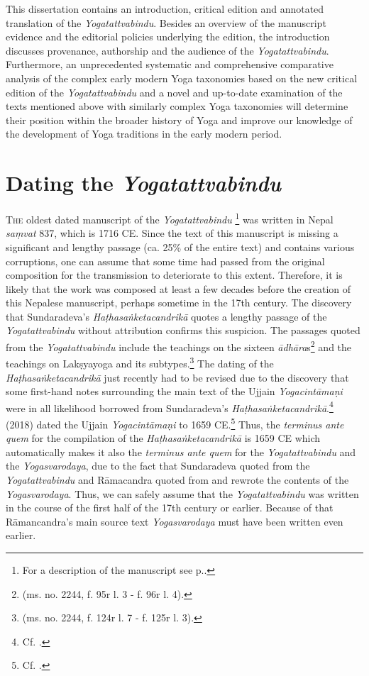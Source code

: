 This dissertation contains an introduction, critical edition and annotated translation of the \textit{Yogatattvabindu}. Besides an overview of the manuscript evidence and the editorial policies underlying the edition, the introduction discusses provenance, authorship and the audience of the \textit{Yogatattvabindu}. Furthermore, an unprecedented systematic and comprehensive comparative analysis of the complex early modern Yoga taxonomies based on the new critical edition of the \textit{Yogatattvabindu} and a novel and up-to-date examination of the texts mentioned above with similarly complex Yoga taxonomies will determine their position within the broader history of Yoga and improve our knowledge of the development of Yoga traditions in the early modern period.

\section{Dating the \textit{Yogatattvabindu}}
\label{dating}
\lettrine[lines=2, lhang=0.2, loversize=0.25]{T}{he} oldest dated manuscript of the \textit{Yogatattvabindu} \footnote{For a description of the manuscript see  p.\pageref{n1description}.} was written in Nepal \textit{saṃvat} 837, which is 1716 CE. Since the text of this manuscript is missing a significant and lengthy passage (ca. 25\% of the entire text) and contains various corruptions, one can assume that some time had passed from the original composition for the transmission to deteriorate to this extent. Therefore, it is likely that the work was composed at least a few decades before the creation of this Nepalese manuscript, perhaps sometime in the 17th century. The discovery that Sundaradeva's \textit{Haṭhasaṅketacandrikā} quotes a lengthy passage of the \textit{Yogatattvabindu} without attribution confirms this suspicion. The passages quoted from the \textit{Yogatattvabindu} include the teachings on the sixteen \textit{ādhāra}s\footnote{ (ms. no. 2244, f. 95r l. 3 - f. 96r l. 4).} and the teachings on Lakṣyayoga and its subtypes.\footnote{ (ms. no. 2244, f. 124r l. 7 - f. 125r l. 3).} The dating of the \textit{Haṭhasaṅketacandrikā} just recently had to be revised due to the discovery that some first-hand notes surrounding the main text of the Ujjain \textit{Yogacintāmaṇi} were in all likelihood borrowed from Sundaradeva's \textit{Haṭhasaṅketacandrikā}.\footnote{Cf. \citeauthor[2024: 52-54]{birch2024}.} \citeauthor{birch2018proliferation} (2018) dated the Ujjain \textit{Yogacintāmaṇi} to 1659 CE.\footnote{Cf. \citeauthor[2018: 50, n. 111]{birch2018proliferation}.} Thus, the \textit{terminus ante quem} for the compilation of the \textit{Haṭhasaṅketacandrikā} is 1659 CE which automatically makes it also the \textit{terminus ante quem} for the \textit{Yogatattvabindu} and the \textit{Yogasvarodaya}, due to the fact that Sundaradeva quoted from the \textit{Yogatattvabindu} and Rāmacandra quoted from and rewrote the contents of the \textit{Yogasvarodaya}. Thus, we can safely assume that the \textit{Yogatattvabindu} was written in the course of the first half of the 17th century or earlier. Because of that Rāmancandra's main source text \textit{Yogasvarodaya} must have been written even earlier.

